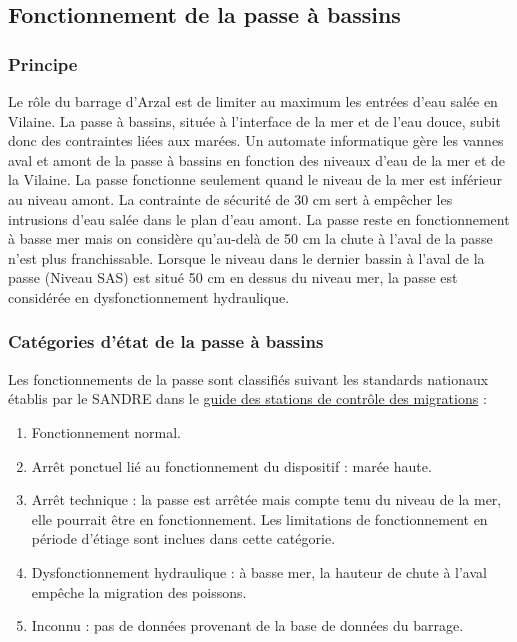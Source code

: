 \documentclass[11pt,twocolumn,titlepage,twoside]{article}\usepackage[]{graphicx}\usepackage[]{color}
\begin{document}
\subsection{Fonctionnement de la passe à bassins}
\subsubsection{Principe}
Le rôle du barrage d’Arzal est de limiter au maximum les entrées d’eau salée en Vilaine. La passe à bassins, 
située à l’interface de la mer et de l’eau douce, subit donc des contraintes liées aux marées.
Un automate informatique gère les vannes aval et amont de la passe à bassins en fonction des niveaux d’eau de la mer
et de la Vilaine. La passe fonctionne seulement quand le niveau de la mer est inférieur au niveau amont. 
La contrainte de sécurité de 30 cm sert à empêcher les intrusions d’eau salée dans le plan d’eau amont. 
La passe reste en fonctionnement à basse mer mais on considère qu’au-delà de 50 cm la chute à l’aval de la passe 
n’est plus franchissable. Lorsque le niveau dans le dernier bassin à l’aval de la passe (Niveau SAS) 
est situé 50 cm en dessus du niveau mer, la passe est considérée en dysfonctionnement hydraulique.
\subsubsection{Catégories d'état de la passe à bassins}
Les fonctionnements de la passe sont classifiés suivant les standards nationaux
établis par le SANDRE dans le
\href{http://www.sandre.eaufrance.fr/notice-doc/station-de-contrôle-des-migrations-de-poissons}{guide
des stations de contrôle des migrations} :
\begin{enumerate}
\item Fonctionnement normal.
\item Arrêt ponctuel lié au fonctionnement du dispositif : marée haute.
\item Arrêt technique : la passe est arrêtée mais compte tenu du niveau de la mer, elle pourrait être en fonctionnement. 
Les limitations de fonctionnement en période d’étiage sont inclues dans cette catégorie.
\item Dysfonctionnement hydraulique : à basse mer, la hauteur de chute à l’aval empêche la migration des poissons.
\item Inconnu : pas de données provenant de la base de données du barrage.
\end{enumerate}
\end{document}
